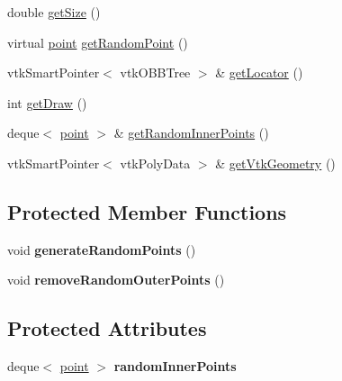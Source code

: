\begin{DoxyCompactItemize}
\item 
double \hyperlink{class_partially_vascularized_domain_a88c04b73a8ffd9e8ddbc4a1c118a1795}{get\+Size} ()
\item 
virtual \hyperlink{structpoint}{point} \hyperlink{class_partially_vascularized_domain_a817dcd8122892b14ed112135aa4a1fe0}{get\+Random\+Point} ()
\item 
vtk\+Smart\+Pointer$<$ vtk\+O\+B\+B\+Tree $>$ \& \hyperlink{class_partially_vascularized_domain_aaa408e316948645dd383abfdd327c733}{get\+Locator} ()
\item 
int \hyperlink{class_partially_vascularized_domain_aefb222fe10e4691e965b3a2035e0b119}{get\+Draw} ()
\item 
deque$<$ \hyperlink{structpoint}{point} $>$ \& \hyperlink{class_partially_vascularized_domain_abbfb8f486b00e62117b564874a454395}{get\+Random\+Inner\+Points} ()
\item 
vtk\+Smart\+Pointer$<$ vtk\+Poly\+Data $>$ \& \hyperlink{class_partially_vascularized_domain_aa2acdedb98eb9cd168b9ab4cfa38c485}{get\+Vtk\+Geometry} ()
\end{DoxyCompactItemize}
\subsection*{Protected Member Functions}
\begin{DoxyCompactItemize}
\item 
void {\bfseries generate\+Random\+Points} ()\hypertarget{class_partially_vascularized_domain_a2cd16ecba9744376ed887ac5c384f8d6}{}\label{class_partially_vascularized_domain_a2cd16ecba9744376ed887ac5c384f8d6}

\item 
void {\bfseries remove\+Random\+Outer\+Points} ()\hypertarget{class_partially_vascularized_domain_af607ad95d6ee6f3642d53cef956c22d2}{}\label{class_partially_vascularized_domain_af607ad95d6ee6f3642d53cef956c22d2}

\end{DoxyCompactItemize}
\subsection*{Protected Attributes}
\begin{DoxyCompactItemize}
\item 
deque$<$ \hyperlink{structpoint}{point} $>$ {\bfseries random\+Inner\+Points}\hypertarget{class_partially_vascularized_domain_abe9eaae7ebdf88e4bb1f9389d697c5c3}{}\label{class_partially_vascularized_domain_abe9eaae7ebdf88e4bb1f9389d697c5c3}

\end{DoxyCompactItemize}
